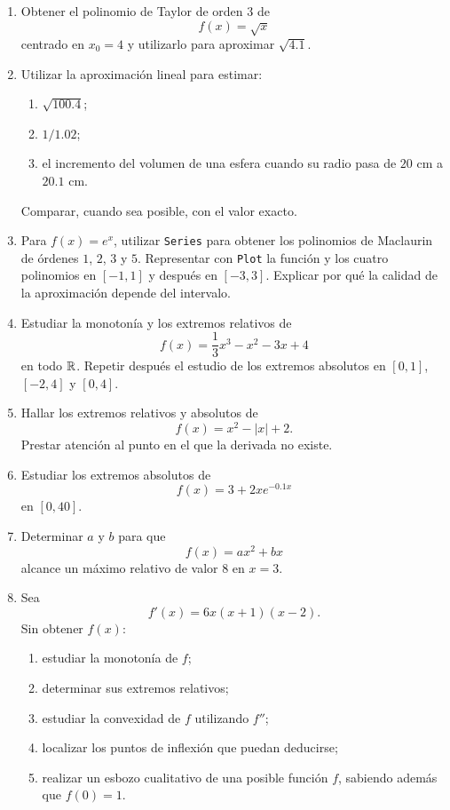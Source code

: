 \begin{enumerate}[label=\textbf{\arabic*.},leftmargin=*]
\item Obtener el polinomio de Taylor de orden $3$ de
\[
f(x)=\sqrt{x}
\]
centrado en $x_0=4$ y utilizarlo para aproximar $\sqrt{4.1}$.

\item Utilizar la aproximación lineal para estimar:
\begin{enumerate}[label=\alph*)]
\item $\sqrt{100.4}$;
\item $1/1.02$;
\item el incremento del volumen de una esfera cuando su radio pasa de $20$ cm a $20.1$ cm.
\end{enumerate}
Comparar, cuando sea posible, con el valor exacto.

\item \M Para $f(x)=e^x$, utilizar \texttt{Series} para obtener los polinomios de Maclaurin de órdenes $1$, $2$, $3$ y $5$. Representar con \texttt{Plot} la función y los cuatro polinomios en $[-1,1]$ y después en $[-3,3]$. Explicar por qué la calidad de la aproximación depende del intervalo.

\item Estudiar la monotonía y los extremos relativos de
\[
f(x)=\frac13x^3-x^2-3x+4
\]
en todo $\mathbb{R}$. Repetir después el estudio de los extremos absolutos en $[0,1]$, $[-2,4]$ y $[0,4]$.

\item Hallar los extremos relativos y absolutos de
\[
f(x)=x^2-|x|+2.
\]
Prestar atención al punto en el que la derivada no existe.

\item Estudiar los extremos absolutos de
\[
f(x)=3+2xe^{-0.1x}
\]
en $[0,40]$.

\item Determinar $a$ y $b$ para que
\[
f(x)=ax^2+bx
\]
alcance un máximo relativo de valor $8$ en $x=3$.

\item Sea
\[
f'(x)=6x(x+1)(x-2).
\]
Sin obtener $f(x)$:
\begin{enumerate}[label=\alph*)]
\item estudiar la monotonía de $f$;
\item determinar sus extremos relativos;
\item estudiar la convexidad de $f$ utilizando $f''$;
\item localizar los puntos de inflexión que puedan deducirse;
\item realizar un esbozo cualitativo de una posible función $f$, sabiendo además que $f(0)=1$.
\end{enumerate}


\end{enumerate}
